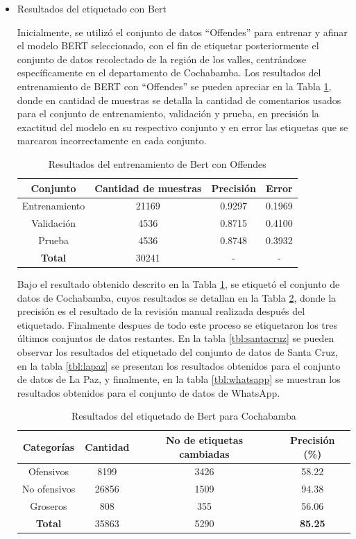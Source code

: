 \begin{itemize}
 \item{Resultados del etiquetado con Bert}

Inicialmente, se utilizó el conjunto de datos ``Offendes'' para entrenar y afinar  el modelo BERT seleccionado, con el fin de etiquetar posteriormente el conjunto de datos recolectado de la región de los valles, centrándose específicamente en el departamento de Cochabamba. Los resultados del entrenamiento de BERT con ``Offendes'' se pueden apreciar en la Tabla \ref{tbl:bert}, donde en cantidad de muestras se detalla la cantidad de comentarios usados para el conjunto de entrenamiento, validación y prueba, en precisión la exactitud del modelo en su respectivo conjunto y en error las etiquetas que se marcaron incorrectamente en cada conjunto.

\begin{table}[!ht]
	\centering
	\begin{tabular}{|c|c|c|c|}
		\hline
		\textbf{Conjunto} & \textbf{Cantidad de muestras} & \textbf{Precisión} & \textbf{Error} \\ \hline
		Entrenamiento & 21169 & 0.9297 & 0.1969 \\ 
		Validación & 4536 & 0.8715 & 0.4100 \\ 
		Prueba & 4536 & 0.8748 & 0.3932 \\ \hline
		\textbf{Total} & 30241 & - & - \\ \hline
	\end{tabular}
	\caption{Resultados del entrenamiento de Bert con Offendes}
	\label{tbl:bert}
\end{table}


Bajo el resultado obtenido descrito en la Tabla \ref{tbl:bert}, se etiquetó el conjunto de datos de Cochabamba, cuyos resultados se detallan en la Tabla \ref{tbl:cochabamba}, donde la precisión es el resultado de la revisión manual realizada después del etiquetado. Finalmente despues de todo este proceso se etiquetaron los tres últimos conjuntos de datos restantes. En la tabla \ref{tbl:santacruz} se pueden observar los resultados del etiquetado del conjunto de datos de Santa Cruz, en la tabla \ref{tbl:lapaz} se presentan los resultados obtenidos para el conjunto de datos de La Paz, y finalmente, en la tabla \ref{tbl:whatsapp} se muestran los resultados obtenidos para el conjunto de datos de WhatsApp.


\begin{table}[!ht]
	\centering
	\begin{tabular}{|c|c|c|c|}
		\hline
		\textbf{Categorías} & \textbf{Cantidad} & \textbf{No de etiquetas cambiadas} & \textbf{Precisión (\%)} \\ \hline
		Ofensivos & 8199 & 3426 & 58.22 \\ 
		No ofensivos & 26856 & 1509 & 94.38 \\ 
		Groseros & 808 & 355 & 56.06 \\ \hline
		\textbf{Total} & 35863 & 5290 & \textbf{85.25} \\ \hline
	\end{tabular}
	\caption{Resultados del etiquetado de Bert para Cochabamba}
	\label{tbl:cochabamba}
\end{table}


\end{itemize}

